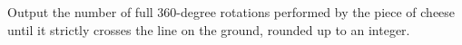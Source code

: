

Output the number of full $360$-degree rotations performed by the piece of
cheese until it strictly crosses the line on the ground, rounded up to an integer.
